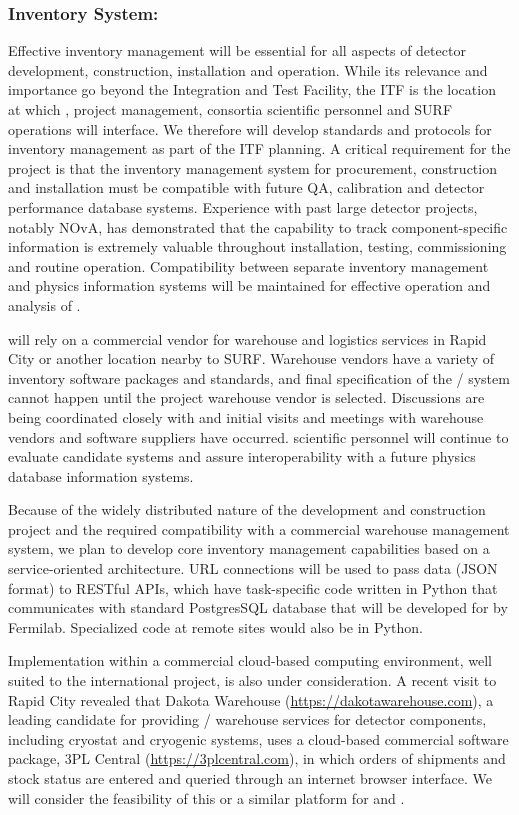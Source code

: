 \subsubsection{Inventory System:}
Effective inventory management will be essential for all aspects of
 detector development, construction, installation and
operation.  While its relevance and importance go beyond the
Integration and Test Facility, the ITF is the location at which
,  project management, consortia scientific
personnel and SURF operations will interface.  We therefore will
develop standards and protocols for inventory management as part of
the ITF planning.  A critical requirement for the project is that the
inventory management system for procurement, construction and
installation must be compatible with future QA, calibration and
detector performance database systems.  Experience with past large
detector projects, notably NOvA, has demonstrated that the capability
to track component-specific information is extremely valuable
throughout installation, testing, commissioning and routine operation.
Compatibility between separate inventory management and physics
information systems will be maintained for effective operation and
analysis of .

 will rely on a commercial vendor for warehouse and
logistics services in Rapid City or another location nearby to SURF.
Warehouse vendors have a variety of inventory software packages and
standards, and final specification of the /
system cannot happen until the project warehouse vendor is selected.
Discussions are being coordinated closely with  and
initial visits and meetings with warehouse vendors and software
suppliers have occurred.   scientific personnel will
continue to evaluate candidate systems and assure interoperability
with a future physics database information systems.

Because of the widely distributed nature of the 
development and construction project and the required compatibility
with a commercial warehouse management system, we plan to develop core
inventory management capabilities based on a service-oriented
architecture.  URL connections will be used to pass data (JSON format)
to RESTful APIs, which have task-specific code written in Python that
communicates with standard PostgresSQL database that will be developed
for  by Fermilab.  Specialized code at remote sites would
also be in Python.

Implementation within a commercial cloud-based computing environment,
well suited to the international  project, is also under
consideration.  A recent visit to Rapid City revealed that Dakota
Warehouse
(\href{https://dakotawarehouse.com}{https://dakotawarehouse.com}), a
leading candidate for providing / warehouse
services for detector components, including cryostat and cryogenic
systems, uses a cloud-based commercial software package, 3PL Central
(\href{https://3plcentral.com}{https://3plcentral.com}), in which
orders of shipments and stock status are entered and queried through
an internet browser interface.  We will consider the feasibility of
this or a similar platform for  and .
